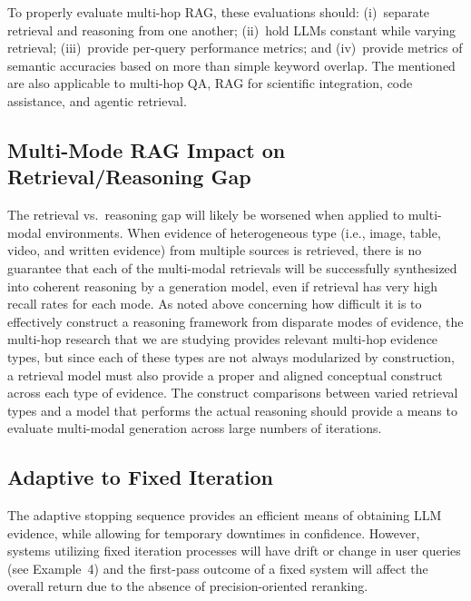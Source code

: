 \documentclass[11pt,a4paper]{article}
\begin{document}
To properly evaluate multi-hop RAG, these evaluations should:
(i)~separate retrieval and reasoning from one another;
(ii)~hold LLMs constant while varying retrieval;
(iii)~provide per-query performance metrics; and
(iv)~provide metrics of semantic accuracies based on more than simple
keyword overlap.
The mentioned are also applicable to multi-hop QA, RAG for scientific
integration, code assistance, and agentic retrieval.

\subsection{Multi-Mode RAG Impact on Retrieval/Reasoning Gap}

The retrieval vs.\ reasoning gap will likely be worsened when applied
to multi-modal environments.
When evidence of heterogeneous type (i.e., image, table, video, and
written evidence) from multiple sources is retrieved, there is no
guarantee that each of the multi-modal retrievals will be
successfully synthesized into coherent reasoning by a generation
model, even if retrieval has very high recall rates for each mode.
As noted above concerning how difficult it is to effectively
construct a reasoning framework from disparate modes of evidence, the
multi-hop research that we are studying provides relevant multi-hop
evidence types, but since each of these types are not always
modularized by construction, a retrieval model must also provide a
proper and aligned conceptual construct across each type of evidence.
The construct comparisons between varied retrieval types and a model
that performs the actual reasoning should provide a means to evaluate
multi-modal generation across large numbers of iterations.

\subsection{Adaptive to Fixed Iteration}

The adaptive stopping sequence provides an efficient means of
obtaining LLM evidence, while allowing for temporary downtimes in
confidence.
However, systems utilizing fixed iteration processes will have drift
or change in user queries (see Example~4) and the first-pass outcome
of a fixed system will affect the overall return due to the absence
of precision-oriented reranking.

\end{document}
